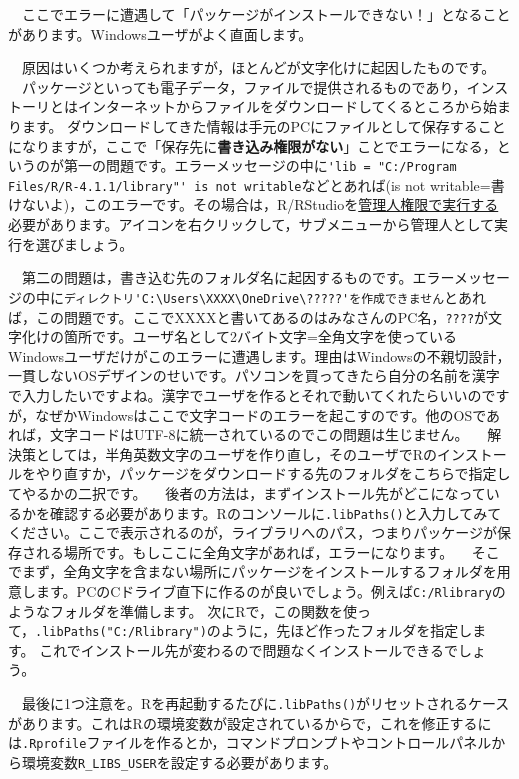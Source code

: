 \documentclass{ltjbook}
\begin{document}
\begin{tcolorbox}[title=パッケージのインストール先,fonttitle=\gtfamily\sffamily\bfseries,colframe=blue,colback=blue!3!]
　ここでエラーに遭遇して「パッケージがインストールできない！」となることがあります。Windowsユーザがよく直面します。

　原因はいくつか考えられますが，ほとんどが文字化けに起因したものです。
　パッケージといっても電子データ，ファイルで提供されるものであり，インストーリとはインターネットからファイルをダウンロードしてくるところから始まります。
ダウンロードしてきた情報は手元のPCにファイルとして保存することになりますが，ここで「保存先に\textbf{書き込み権限がない}」ことでエラーになる，というのが第一の問題です。エラーメッセージの中に\verb|'lib = "C:/Program Files/R/R-4.1.1/library"' is not writable|などとあれば(is not writable=書けないよ)，このエラーです。その場合は，R/RStudioを\underline{管理人権限で実行する}必要があります。アイコンを右クリックして，サブメニューから管理人として実行を選びましょう。

　第二の問題は，書き込む先のフォルダ名に起因するものです。エラーメッセージの中に\verb|ディレクトリ'C:\Users\XXXX\OneDrive\?????'を作成できません|とあれば，この問題です。ここでXXXXと書いてあるのはみなさんのPC名，\verb|????|が文字化けの箇所です。ユーザ名として2バイト文字=全角文字を使っているWindowsユーザだけがこのエラーに遭遇します。理由はWindowsの不親切設計，一貫しないOSデザインのせいです。パソコンを買ってきたら自分の名前を漢字で入力したいですよね。漢字でユーザを作るとそれで動いてくれたらいいのですが，なぜかWindowsはここで文字コードのエラーを起こすのです。他のOSであれば，文字コードはUTF-8に統一されているのでこの問題は生じません。
　解決策としては，半角英数文字のユーザを作り直し，そのユーザでRのインストールをやり直すか，パッケージをダウンロードする先のフォルダをこちらで指定してやるかの二択です。
　後者の方法は，まずインストール先がどこになっているかを確認する必要があります。Rのコンソールに\verb|.libPaths()|と入力してみてください。ここで表示されるのが，ライブラリへのパス，つまりパッケージが保存される場所です。もしここに全角文字があれば，エラーになります。
　そこでまず，全角文字を含まない場所にパッケージをインストールするフォルダを用意します。PCのCドライブ直下に作るのが良いでしょう。例えば\verb|C:/Rlibrary|のようなフォルダを準備します。
次にRで，この関数を使って，\verb|.libPaths("C:/Rlibrary")|のように，先ほど作ったフォルダを指定します。
これでインストール先が変わるので問題なくインストールできるでしょう。

　最後に1つ注意を。Rを再起動するたびに\verb|.libPaths()|がリセットされるケースがあります。これはRの環境変数が設定されているからで，これを修正するには\verb|.Rprofile|ファイルを作るとか，コマンドプロンプトやコントロールパネルから環境変数\verb|R_LIBS_USER|を設定する必要があります。
\end{tcolorbox}
\end{document}
